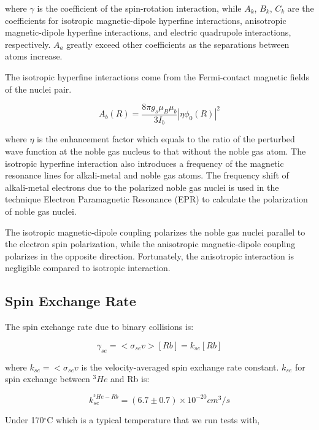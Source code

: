 where $\gamma$ is the coefficient of the spin-rotation interaction, while $A_{k}$, $B_{k}$, $C_{k}$ are the coefficients for isotropic magnetic-dipole hyperfine interactions, anisotropic magnetic-dipole hyperfine interactions, and electric quadrupole interactions, respectively. $A_{a}$ greatly exceed other coefficients as the separations between atoms increase. 

The isotropic hyperfine interactions come from the Fermi-contact magnetic fields of the nuclei pair. 

\begin{equation}
A_{b}(R)=\frac{8\pi g_{s}\mu_{B}\mu_{b}}{3I_{b}}|\eta \phi_{0}(R)|^{2}
\end{equation}

where $\eta$ is the enhancement factor which equals to the ratio of the perturbed wave function at the noble gas nucleus to that without the noble gas atom. The isotropic hyperfine interaction also introduces a frequency of the magnetic resonance lines for alkali-metal and noble gas atoms. The frequency shift of alkali-metal electrons due to the polarized noble gas nuclei is used in the technique Electron Paramagnetic Resonance (EPR) to calculate the polarization of noble gas nuclei.

The isotropic magnetic-dipole coupling polarizes the noble gas nuclei parallel to the electron spin polarization, while the anisotropic magnetic-dipole coupling polarizes in the opposite direction. Fortunately, the anisotropic interaction is negligible compared to isotropic interaction.

\subsection{Spin Exchange Rate}

The spin exchange rate due to binary collisions is:

\begin{equation}
\gamma_{se}=<\sigma_{se}v>[Rb]=k_{se}[Rb]
\end{equation}

where $k_{se}=<\sigma_{se}v$ is the velocity-averaged spin exchange rate constant. $k_{se}$ for spin exchange between $^{3}He$ and Rb is:

\begin{equation}
k_{se}^{^{3}He-Rb}=(6.7\pm 0.7)\times 10^{-20}cm^{3}/s
\end{equation}

Under 170$^{\circ}$C which is a typical temperature that we run tests with,


